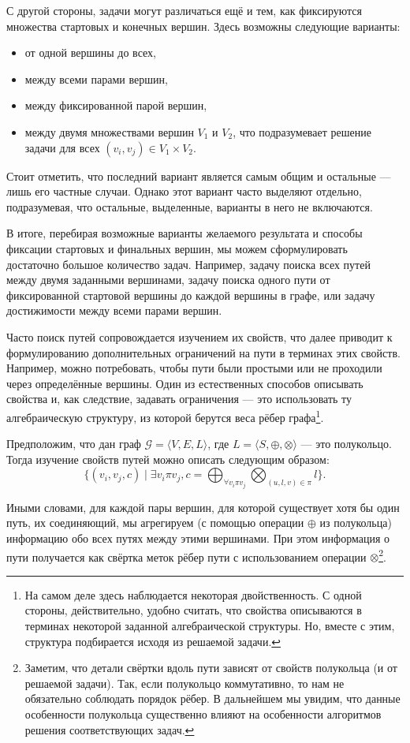 С другой стороны, задачи могут различаться ещё и тем, как фиксируются множества стартовых и конечных вершин.
Здесь возможны следующие варианты:
\begin{itemize}
\item от одной вершины до всех,
\item между всеми парами вершин,
\item между фиксированной парой вершин,
\item между двумя множествами вершин $V_1$ и $V_2$, что подразумевает решение задачи для всех $(v_i,v_j) \in V_1 \times V_2$.
\end{itemize}

Стоит отметить, что последний вариант является самым общим и остальные --- лишь его частные случаи.
Однако этот вариант часто выделяют отдельно, подразумевая, что остальные, выделенные, варианты в него не включаются.

В итоге, перебирая возможные варианты желаемого результата и способы фиксации стартовых и финальных вершин, мы можем сформулировать достаточно большое количество задач. Например, задачу поиска всех путей между двумя заданными вершинами, задачу поиска одного пути от фиксированной стартовой вершины до каждой вершины в графе, или задачу достижимости между всеми парами вершин.

Часто поиск путей сопровождается изучением их свойств, что далее приводит к формулированию дополнительных ограничений на пути в терминах этих свойств. Например, можно потребовать, чтобы пути были простыми или не проходили через определённые вершины. Один из естественных способов описывать свойства и, как следствие, задавать ограничения --- это использовать ту алгебраическую структуру, из которой берутся веса рёбер графа\footnote{На самом деле здесь наблюдается некоторая двойственность. С одной стороны, действительно, удобно считать, что свойства описываются в терминах некоторой заданной алгебраической структуры. Но, вместе с этим, структура подбирается исходя из решаемой задачи.}.

Предположим, что дан граф $\mathcal{G} = \langle V, E, L\rangle $, где $L = \langle S, \oplus, \otimes \rangle$ --- это полукольцо. Тогда изучение свойств путей можно описать следующим образом:
\begin{equation} \label{eq:algPathProblem}
  \{(v_i, v_j, c) \mid \exists v_i \pi v_j, c = \bigoplus_{\forall v_i \pi v_j} \bigotimes_{(u,l,v) \in \pi } l \}.
\end{equation}

Иными словами, для каждой пары вершин, для которой существует хотя бы один путь, их соединяющий, мы агрегируем (с помощью операции $\oplus$ из полукольца) информацию обо всех путях между этими вершинами. При этом информация о пути получается как свёртка меток рёбер пути с использованием операции $\otimes$\footnote{Заметим, что детали свёртки вдоль пути зависят от свойств полукольца (и от решаемой задачи). Так, если полукольцо коммутативно, то нам не обязательно соблюдать порядок рёбер. В дальнейшем мы увидим, что данные особенности полукольца существенно влияют на особенности алгоритмов решения соответствующих задач.}.

